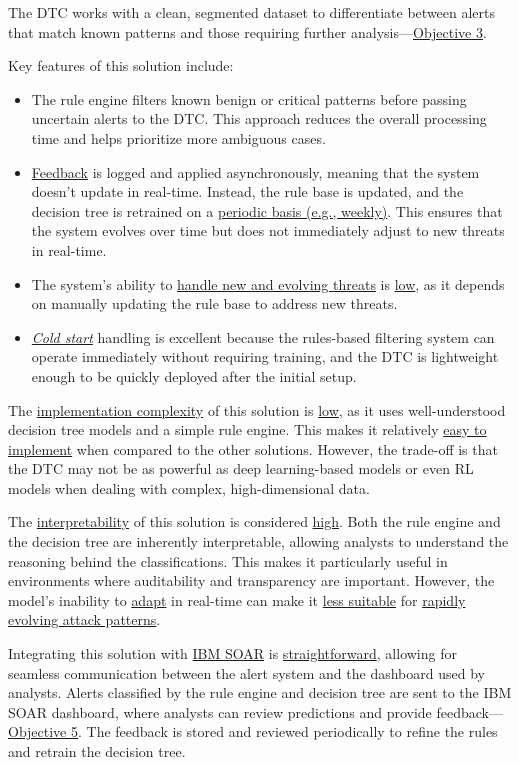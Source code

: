 The DTC works with a clean, segmented dataset to differentiate between alerts that match known patterns and those requiring further analysis—\hyperref[objective3]{Objective 3}.

Key features of this solution include:
\begin{itemize}
    \item The rule engine filters known benign or critical patterns before passing uncertain alerts to the DTC. This approach reduces the overall processing time and helps prioritize more ambiguous cases.
    \item \underline{Feedback} is logged and applied asynchronously, meaning that the system doesn't update in real-time. Instead, the rule base is updated, and the decision tree is retrained on a \underline{periodic basis (e.g., weekly)}. This ensures that the system evolves over time but does not immediately adjust to new threats in real-time.
    \item The system's ability to \underline{handle new and evolving threats} is \underline{low}, as it depends on manually updating the rule base to address new threats.
    \item \underline{\textit{Cold start}} handling is excellent because the rules-based filtering system can operate immediately without requiring training, and the DTC is lightweight enough to be quickly deployed after the initial setup.
\end{itemize}

The \underline{implementation complexity} of this solution is \underline{low}, as it uses well-understood decision tree models and a simple rule engine. 
This makes it relatively \underline{easy to implement} when compared to the other solutions. 
However, the trade-off is that the DTC may not be as powerful as deep learning-based models or even RL models when dealing with complex, high-dimensional data.

The \underline{interpretability} of this solution is considered \underline{high}. 
Both the rule engine and the decision tree are inherently interpretable, allowing analysts to understand the reasoning behind the classifications. 
This makes it particularly useful in environments where auditability and transparency are important. 
However, the model's inability to \underline{adapt} in real-time can make it \underline{less suitable} for \underline{rapidly evolving attack patterns}.

Integrating this solution with \underline{IBM SOAR} is \underline{straightforward}, allowing for seamless communication between the alert system and the dashboard used by analysts. 
Alerts classified by the rule engine and decision tree are sent to the IBM SOAR dashboard, where analysts can review predictions and provide feedback—\hyperref[objective5]{Objective 5}.
The feedback is stored and reviewed periodically to refine the rules and retrain the decision tree. 

